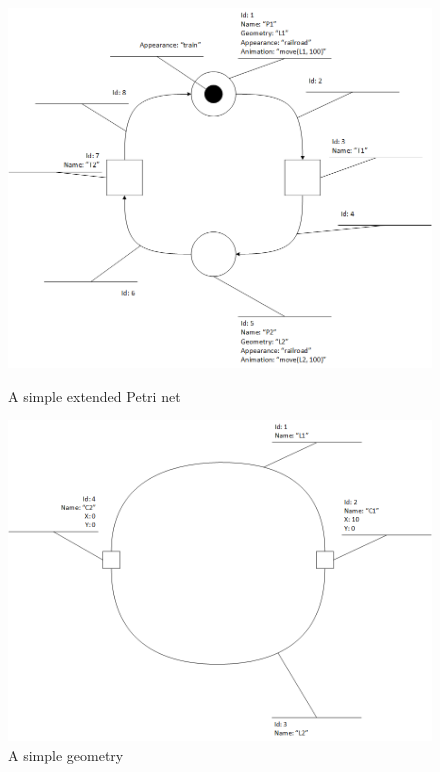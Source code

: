 \begin{figure}[ht]
	\begin{minipage}[b]{0.45\linewidth}
	\centering
		\includegraphics[width=1\textwidth]{image/example_petrinet.png}
		\caption{A simple extended Petri net}
		\label{fig:example_petrinet}
	\end{minipage}
\hspace{0.5cm}
	\begin{minipage}[b]{0.45\linewidth}
	\centering
		\includegraphics[width=1\textwidth]{image/example_petrinet_geometry.png}
		\caption{A simple geometry}
		\label{fig:example_petrinet_geometry}
	\end{minipage}

\end{figure}


